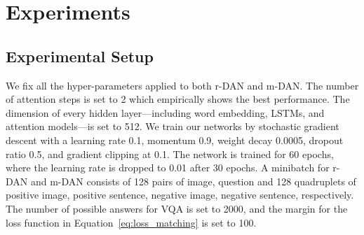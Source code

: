 \documentclass[10pt,twocolumn,letterpaper]{article}
\begin{document}
\section{Experiments}


\subsection{Experimental Setup}
We fix all the hyper-parameters applied to both r-DAN and m-DAN.
The number of attention steps  is set to 2 which empirically shows the best performance.
The dimension of every hidden layer---including word embedding, LSTMs, and attention models---is set to 512.
We train our networks by stochastic gradient descent with a learning rate 0.1, momentum 0.9, weight decay 0.0005, dropout ratio 0.5, and gradient clipping at 0.1.
The network is trained for 60 epochs, where the learning rate is dropped to 0.01 after 30 epochs.
A minibatch for r-DAN and m-DAN consists of 128 pairs of image, question and 128 quadruplets of positive image, positive sentence, negative image, negative sentence, respectively.
The number of possible answers  for VQA is set to 2000, and the margin  for the loss function in Equation~\ref{eq:loss_matching} is set to 100.
\end{document}
